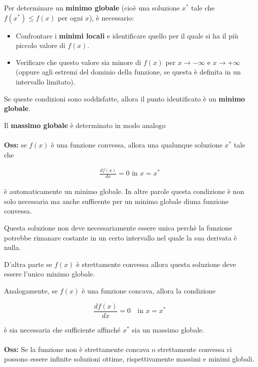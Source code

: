 \documentclass[a4paper, 11pt]{article}
\begin{document}
        Per determinare un \textbf{minimo globale} (cioè una soluzione \( x^* \) tale che \( f(x^*) \leq f(x) \) per ogni \( x \)), è necessario:

        \begin{itemize}
            \item Confrontare i \textbf{minimi locali} e identificare quello per il quale si ha il più piccolo valore di \( f(x) \).
            \item Verificare che questo valore sia minore di \( f(x) \) per \( x \to -\infty \) e \( x \to +\infty \) (oppure agli estremi del dominio della funzione, se questa è definita in un intervallo limitato).
        \end{itemize}

        Se queste condizioni sono soddisfatte, allora il punto identificato è un \textbf{minimo globale}.

        Il \textbf{massimo globale} è determinato in modo analogo

        \paragraph{}
        \textbf{Oss: } se $f(x)$ è una funzione convessa, allora una qualunque soluzione $x^*$ tale che 

        \begin{align*}
            \frac{df(x)}{dx} = 0 \text{ in $x = x^*$}
        \end{align*}

        è automaticamente un minimo globale.
        In altre parole questa condizione è non solo necessaria ma anche sufficente per un minimo globale diuna funzione convessa.

        Questa soluzione non deve necessariamente essere unica perchè la funzione potrebbe rimanare costante in un certo intervallo nel quale la sua derivata è nulla.

        D’altra parte se $f(x)$ è strettamente convessa allora questa soluzione deve essere l’unico minimo globale.

        Analogamente, se \( f(x) \) è una funzione concava, allora la condizione


        \[
            \frac{df(x)}{dx} = 0 \quad \text{in } x = x^*
        \]


        è sia necessaria che sufficiente affinché \( x^* \) sia un massimo globale.

        \paragraph{}
        \textbf{Oss: }  Se la funzione non è strettamente concava o strettamente convessa ci possono essere infinite soluzioni ottime, rispettivamente massimi
        e minimi globali.
\end{document}

